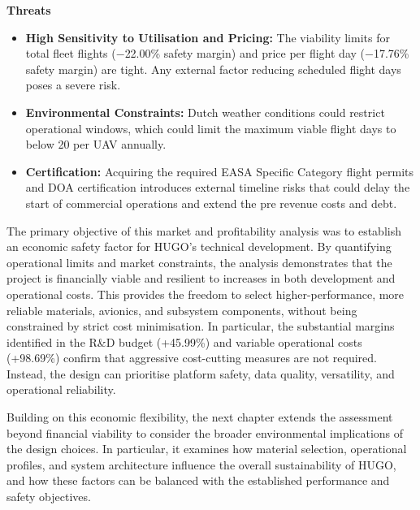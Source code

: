 \noindent\textbf{Threats}
\begin{itemize}
    \item \textbf{High Sensitivity to Utilisation and Pricing:} The viability limits for total fleet flights ($-$22.00\% safety margin) and price per flight day ($-$17.76\% safety margin) are tight. Any external factor reducing scheduled flight days poses a severe risk.
    \item \textbf{Environmental Constraints:} Dutch weather conditions could restrict operational windows, which could limit the maximum viable flight days to below 20 per UAV annually.
    \item \textbf{Certification:} Acquiring the required EASA Specific Category flight permits and DOA certification introduces external timeline risks that could delay the start of commercial operations and extend the pre revenue costs and debt.
\end{itemize}


The primary objective of this market and profitability analysis was to establish an economic safety factor for HUGO’s technical development. By quantifying operational limits and market constraints, the analysis demonstrates that the project is financially viable and resilient to increases in both development and operational costs. This provides the freedom to select higher-performance, more reliable materials, avionics, and subsystem components, without being constrained by strict cost minimisation. In particular, the substantial margins identified in the R\&D budget (+45.99\%) and variable operational costs (+98.69\%) confirm that aggressive cost-cutting measures are not required. Instead, the design can prioritise platform safety, data quality, versatility, and operational reliability.

Building on this economic flexibility, the next chapter extends the assessment beyond financial viability to consider the broader environmental implications of the design choices. In particular, it examines how material selection, operational profiles, and system architecture influence the overall sustainability of HUGO, and how these factors can be balanced with the established performance and safety objectives.


